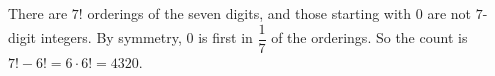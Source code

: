 There are $7!$ orderings of the seven digits, and those starting with $0$ are not $7$-digit integers. By symmetry, $0$ is first in $\dfrac{1}{7}$ of the orderings. So the count is $7!-6!=6\cdot6!=\boxed{4320}$.
